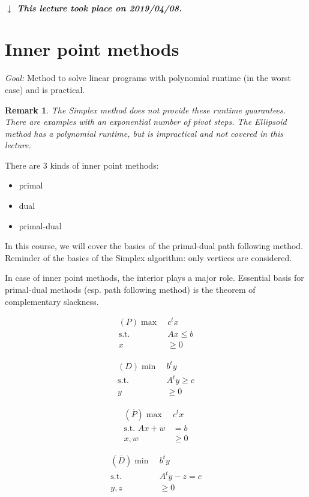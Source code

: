 \documentclass[a4paper]{article}
\numberwithin{lecref}{section}
\newtheorem*{Remark}{Remark}
\newcommand{\dateref}[1]{%
  \begin{mdframed}[backgroundcolor=gray!10,innerbottommargin=0pt,innertopmargin=0pt]
    \paragraph{\textit{$\downarrow$ This lecture took place on #1.}}%
  \end{mdframed}%
}
\begin{document}
\dateref{2019/04/08}

\section{Inner point methods}

\emph{Goal:} Method to solve linear programs with polynomial runtime (in the worst case) and is practical.

\begin{Remark}
	The Simplex method does not provide these runtime guarantees.
	There are examples with an exponential number of pivot steps.
	The Ellipsoid method has a polynomial runtime, but is impractical and not covered in this lecture.
\end{Remark}

There are 3 kinds of inner point methods:
\begin{itemize}
	\item primal
	\item dual
	\item primal-dual
\end{itemize}

In this course, we will cover the basics of the primal-dual path following method.
Reminder of the basics of the Simplex algorithm: only vertices are considered.

In case of inner point methods, the interior plays a major role.
Essential basis for primal-dual methods (esp. path following method) is the theorem of complementary slackness.

\begin{minipage}{0.5\textwidth}
  \begin{align*}
  	(P) \max \:&c^t x \\
  		\text{s.t. } &Ax \leq b \\
  		x &\geq 0
  \end{align*}
\end{minipage}
\begin{minipage}{0.5\textwidth}
	\begin{align*}
		(D) \min \:&b^t y \\
		\text{s.t. } &A^t y \geq c \\
		y &\geq 0
	\end{align*}
\end{minipage}
\begin{minipage}{0.5\textwidth}
	\begin{align*}
		(\overline P) \max \:& c^t x \\
		\text{s.t. } Ax + w &= b \\
		x, w &\geq 0
	\end{align*}
\end{minipage}
\begin{minipage}{0.5\textwidth}
	\begin{align*}
		(\overline D) \min \:& b^t y \\
		\text{s.t. } & A^t y - z = c \\
		y, z &\geq 0
	\end{align*}
\end{minipage}
\end{document}
